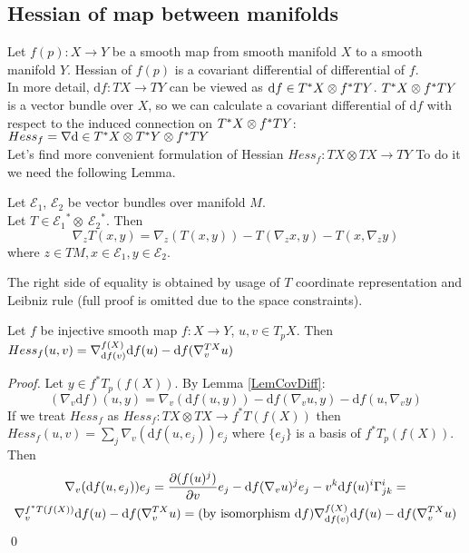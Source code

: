 \documentclass{llncs}
\newcommand{\partderiv}[2]{\frac{\partial #1}{\partial #2}}
\newcommand{\CovariantDerivManif}[2]{\tensor*{\nabla}{^{#1}_{#2}}}
\newcommand{\CovariantDiff}{\nabla}
\newcommand{\CovariantDeriv}[1]{\nabla_{#1}}
\newcommand{\Diff}{\mathrm{d}}
\newcommand{\TangentSpaceP}[1]{{T_p}{#1}}
\newcommand{\TangentBundle}[1]{T{#1}}
\newcommand{\CotangentBundle}[1]{\tensor*{T}{^{*}}{#1}}
\newcommand {\Preimage}[2]{{#2}^*{#1}}
\newcommand \TpPreimage[2]{\Preimage{\TangentSpaceP{#1}}{#2}}
\newcommand \TPreimage[2]{\Preimage{\TangentBundle{#1}}{#2}}
\newcommand {\DiffSpace}[3]{\CotangentBundle{#1}\otimes \TPreimage{#2}{#3}}
\newcommand {\HessianSpace}[3]{\CotangentBundle{#1}\otimes \CotangentBundle{#2}\otimes \TPreimage{#2}{#3}}
\newcommand {\bigeps}{\mathcal{E}}
\begin{document}
\subsection{Hessian of map between manifolds}
Let $f(p):X\to Y$ be a smooth map from smooth manifold $X$ to a smooth manifold $Y$. Hessian of $f(p)$ is a covariant differential of differential of $f$.
\\
In more detail, $\Diff f:TX\to TY$ can be viewed as $\Diff f \in \DiffSpace{X}{Y}{f}$.
$\DiffSpace{X}{Y}{f}$ is a vector bundle over $X$, so we can calculate a covariant differential of $\Diff f$ with respect to the induced connection on $\DiffSpace{X}{Y}{f}$: $Hess_f=\CovariantDiff \Diff \in \HessianSpace{X}{Y}{f}$
\\
Let's find more convenient formulation of Hessian $Hess_f:\TangentBundle{X}\otimes\TangentBundle{X}\to \TangentBundle{Y}$
To do it we need the following Lemma.
\begin{lemma} \label{LemCovDiff}
Let $\bigeps_1$, $\bigeps_2$ be vector bundles over manifold $M$. 
\\
Let $T \in {\bigeps_1}^* \otimes \ {\bigeps_2}^*$. Then
$$\CovariantDeriv{z}{T}(x, y) = \CovariantDeriv{z}{(T(x, y))} -
T(\CovariantDeriv{z}{x}, y) - T(x, \CovariantDeriv{z}{y})$$
where $z \in TM, x \in \bigeps_1, y \in \bigeps_2$. 
\end{lemma}
The right side of equality is obtained by usage of $T$ coordinate representation and Leibniz rule (full proof is omitted due to the space constraints).

\begin{lemma}
Let $f$ be injective smooth map $f:X\to Y$, $u, v\in T_p X$. Then
$Hess_f(u,v)=\CovariantDerivManif{f(X)}{ \Diff f(v)} \Diff f(u) - 
							\Diff f( 
							\CovariantDerivManif{\TangentBundle{X}}{v}u
							)$
\end{lemma}
\begin{proof}
Let $y\in \TpPreimage{(f(X))}{f}$. By Lemma \ref{LemCovDiff}: 
$$(\CovariantDeriv{v} \Diff f)(u, y) = \CovariantDeriv{v}{(\Diff f(u, y))} - \Diff f(\CovariantDeriv{v}{u}, y) - \Diff f({u}, \CovariantDeriv{v}{y})$$
If we treat $Hess_f$ as $Hess_f:\TangentBundle{X}\otimes\TangentBundle{X}\to \TPreimage{(f(X))}{f}$ 
then $Hess_f(u, v)= \sum_{j} \CovariantDeriv{v}{(\Diff f(u, e_j))} e_j$ where $\{e_j\}$ is a basis of $\TpPreimage{(f(X))}{f}$. Then
\begin{multline}
\CovariantDeriv{v}{(\Diff f(u, e_j))} e_j = \partderiv{(f(u)^j)}{v} e_j - \Diff f(\CovariantDeriv{v}{u})^j e_j - v^k \Diff f(u)^i \tensor*{\Gamma}{^i_j_k}= 
\\ 
\CovariantDerivManif{\TPreimage{(f(X))}{f}}{ v} \Diff f(u) - 
							\Diff f( 
							\CovariantDerivManif{\TangentBundle{X}}{v}u
							) = 
							(\textrm{by isomorphism } \Diff f) \CovariantDerivManif{f(X)}{ \Diff f(v)} \Diff f(u) - 
							\Diff f( 
							\CovariantDerivManif{\TangentBundle{X}}{v}u )
\end{multline}
\qed 
\end{proof}
\end{document}
